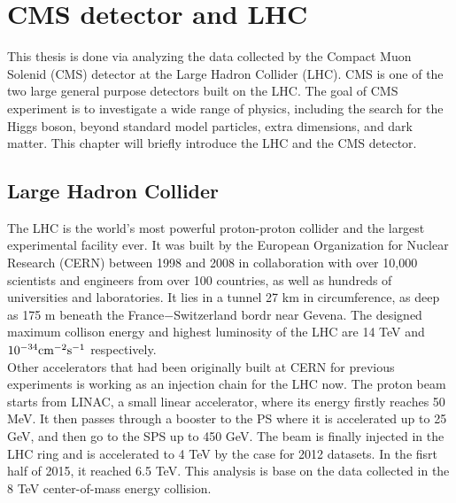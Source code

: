 \chapter{CMS detector and LHC}
This thesis is done via analyzing the data collected by the Compact Muon Solenid (CMS) detector at the Large Hadron Collider (LHC). CMS is one of the two large general purpose detectors built on the LHC. The goal of CMS experiment is to investigate a wide range of physics, including the search for the Higgs boson, beyond standard model particles, extra dimensions, and dark matter. This chapter will briefly introduce the LHC and the CMS detector.


\section{Large Hadron Collider}
The LHC is the world's most powerful proton-proton collider and the largest experimental facility ever. It was built by the European Organization for Nuclear Research (CERN) between 1998 and 2008 in collaboration with over 10,000 scientists and engineers from over 100 countries, as well as hundreds of universities and laboratories. It lies in a tunnel 27 km in circumference, as deep as 175 m beneath the France$-$Switzerland bordr near Gevena. The designed maximum collison energy and highest luminosity of the LHC are 14 TeV and $\textup{10}^{-34} \textup{cm}^{-2}\textup{s}^{-1}$ respectively.\\
Other accelerators that had been originally built at CERN for previous experiments is working as an injection chain for the LHC now. The proton beam starts from LINAC, a small linear accelerator, where its energy firstly reaches 50 MeV. It then passes through a booster to the PS where it is accelerated up to 25 GeV, and then go to the SPS up to 450 GeV. The beam is finally injected in the LHC ring and is accelerated to 4 TeV by the case for 2012 datasets. In the fisrt half of 2015, it reached 6.5 TeV. This analysis is base on the data collected in the 8 TeV center-of-mass energy collision.\\



